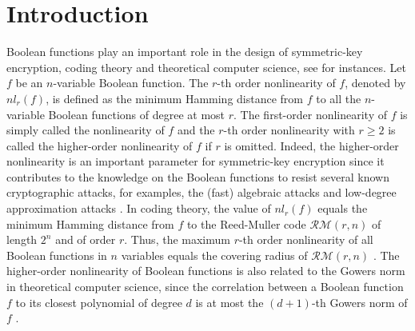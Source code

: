 \documentclass{article}
\newcommand{\0}{\textbf{0}}
\newcommand{\1}{\textbf{1}}
\theoremstyle{plain}
\begin{document}
\section{Introduction}
    Boolean functions play an important role in the design of symmetric-key encryption, coding theory and theoretical computer science, see \cite{Carlet2020book,BhattacharyyaKSSZ2010gowers,CohenHLL1997RMcodecover} for instances.
    Let $f$ be an $n$-variable Boolean function. The $r$-th order nonlinearity of $f$, denoted by $nl_r(f)$,
    is defined as the minimum Hamming distance from $f$ to all the $n$-variable Boolean functions of degree at most $r$.
    The first-order nonlinearity of $f$ is simply called the nonlinearity of $f$ and
    the $r$-th order nonlinearity with $r\ge 2$ is called the higher-order nonlinearity of $f$ if $r$ is omitted.
    Indeed, the higher-order nonlinearity is an important parameter for symmetric-key encryption since
    it contributes to the knowledge on the Boolean functions  to resist  several known cryptographic attacks, for examples,
    the (fast) algebraic attacks \cite{CM03,CFAA03,FAA06,WT10} and low-degree approximation attacks \cite{Golic1996lower_order_approximation,IwataK1999highorderbentfunction,KnudsenR1996nonlinear_approximation,Courtois2002XL_algorithm_and_NL_r}.
    In coding theory, the value of $nl_r(f)$ equals the minimum Hamming distance from $f$ to the Reed-Muller code $\mathcal{RM}(r,n)$ of length $2^n$ and of order $r$.
    Thus, the maximum $r$-th order nonlinearity of all Boolean functions in $n$ variables equals the covering radius of $\mathcal{RM}(r,n)$ \cite{CohenHLL1997RMcodecover}.
    The higher-order nonlinearity of Boolean functions is also related to the Gowers norm in theoretical computer science, since the correlation between a
    Boolean function $f$ to its closest polynomial of degree $d$ is at most the $(d+1)$-th Gowers norm of $f$ \cite{BhattacharyyaKSSZ2010gowers}.
\end{document}
